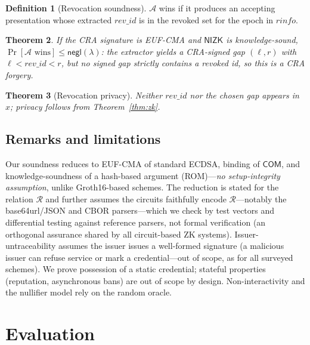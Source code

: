 \documentclass[11pt]{article}
\theoremstyle{plain}
\newtheorem{theorem}{Theorem}
\theoremstyle{definition}
\newtheorem{definition}[theorem]{Definition}
\begin{document}
\begin{definition}[Revocation soundness]\label{def:revsound}
$\mathcal{A}$ wins if it produces an accepting presentation whose extracted
$\mathit{rev\_id}$ is in the revoked set for the epoch in $\mathit{rinfo}$.
\end{definition}
\begin{theorem}\label{thm:revsound}
If the CRA signature is EUF-CMA and $\mathsf{NIZK}$ is knowledge-sound,
$\Pr[\mathcal{A}\text{ wins}]\le\mathsf{negl}(\lambda)$: the extractor yields a
CRA-signed gap $(\ell,r)$ with $\ell<\mathit{rev\_id}<r$, but no signed gap strictly
contains a revoked id, so this is a CRA forgery.
\end{theorem}
\begin{theorem}[Revocation privacy]\label{thm:revpriv}
Neither $\mathit{rev\_id}$ nor the chosen gap appears in $x$; privacy follows from
Theorem~\ref{thm:zk}.
\end{theorem}

\subsection{Remarks and limitations}
Our soundness reduces to EUF-CMA of standard ECDSA, binding of $\mathsf{COM}$, and
knowledge-soundness of a hash-based argument (ROM)---\emph{no setup-integrity
assumption}, unlike Groth16-based schemes. The reduction is stated for the relation
$\mathcal{R}$ and further assumes the circuits faithfully encode $\mathcal{R}$---notably
the base64url/JSON and CBOR parsers---which we check by test vectors and differential
testing against reference parsers, not formal verification (an orthogonal assurance
shared by all circuit-based ZK systems). Issuer-untraceability assumes the issuer
issues a well-formed signature (a malicious issuer can refuse service or mark a
credential---out of scope, as for all surveyed schemes). We prove possession of a
static credential; stateful properties (reputation, asynchronous bans) are out of
scope by design. Non-interactivity and the nullifier model rely on the random oracle.

\section{Evaluation}\label{sec:eval}
\end{document}
